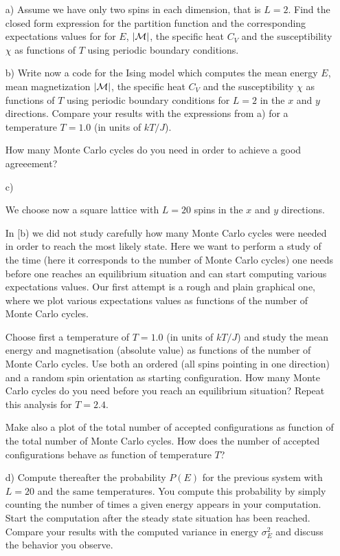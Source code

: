 \documentclass[11pt,a4wide]{article}
\begin{document}
\begin{enumerate}

\item[a)] Assume we have only two spins in each dimension, that is $L=2$.
Find the closed form expression for the partition function and the corresponding
expectations values for
for $E$, $|{\cal M}|$, the specific heat $C_V$ and the susceptibility $\chi$ 
as functions of  $T$ using periodic boundary conditions.



\item[b)] 
Write now a code for the Ising model which computes the mean energy 
$E$, mean magnetization 
$|{\cal M}|$, the specific heat $C_V$ and the susceptibility $\chi$ 
as functions of  $T$ using periodic boundary conditions for 
$L=2$ in the $x$ and $y$ directions. 
Compare your results with the expressions from a)
for  a  temperature $T=1.0$ (in units of $kT/J$). 

How many Monte Carlo cycles do you need in order to achieve a good agreeement?


\item[c)]
 
We choose now a square lattice with $L=20$ spins in the $x$ and $y$ directions. 

In [b) we did not study carefully how many Monte Carlo cycles were needed in order to reach the most likely state. Here
we want to perform a study of the time (here it corresponds to the number 
of Monte Carlo cycles) one needs before one reaches an equilibrium situation 
and can start computing various expectations values. Our 
first attempt is a rough and plain graphical
one, where we plot various expectations values as functions of the number of Monte Carlo cycles.

Choose first a temperature of $T=1.0$ (in units of $kT/J$) and study the 
mean energy and magnetisation (absolute value) as functions of the number of Monte Carlo cycles.
Use both an ordered (all spins pointing in one direction) and a random
spin orientation as starting configuration. 
How many Monte Carlo cycles do you need before you reach an equilibrium situation?
Repeat this analysis for $T=2.4$. 

Make also a plot of the total number of accepted configurations 
as function of the total number of Monte Carlo cycles. How does the number of
accepted configurations behave as function of temperature $T$?


\item[d)] Compute thereafter the probability 
$P(E)$ for the previous system with $L=20$ and the same temperatures.
You compute this probability by simply counting the number of times a 
given energy appears in your computation. Start the computation after 
the steady state situation has been reached.
Compare your results with the computed variance in energy 
$\sigma^2_E$ and discuss the behavior you observe. 
\end{enumerate}
\end{document}
